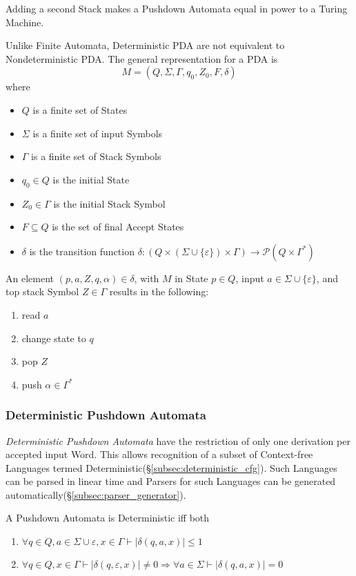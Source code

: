 \documentclass{article}
\begin{document}
Adding a second Stack makes a Pushdown Automata equal in power to a
Turing Machine.

Unlike Finite Automata, Deterministic PDA are not equivalent to
Nondeterministic PDA. The general representation for a PDA is
\[
    M = (Q, \Sigma, \Gamma, q_0, Z_0, F, \delta)
\]
where
\begin{itemize}
\item $Q$ is a finite set of States
\item $\Sigma$ is a finite set of input Symbols
\item $\Gamma$ is a finite set of Stack Symbols
\item $q_0 \in Q$ is the initial State
\item $Z_0 \in \Gamma$ is the initial Stack Symbol
\item $F \subseteq Q$ is the set of final Accept States
\item $\delta$ is the transition function $\delta: (Q \times (\Sigma
  \cup \{\varepsilon\}) \times \Gamma) \rightarrow \mathcal{P}(Q \times
  \Gamma^*)$
\end{itemize}

An element $(p,a,Z,q,\alpha)\in\delta$, with $M$ in State $p \in Q$,
input $a \in \Sigma \cup \{\varepsilon\}$, and top stack Symbol $Z \in
\Gamma$ results in the following:
\begin{enumerate}
\item read $a$
\item change state to $q$
\item pop $Z$
\item push $\alpha \in \Gamma^*$
\end{enumerate}

\subsubsection{Deterministic Pushdown Automata}\label{subsec:deterministic_pda}
\emph{Deterministic Pushdown Automata} have the restriction of only
one derivation per accepted input Word. This allows recognition of a
subset of Context-free Languages termed
Deterministic(\S\ref{subsec:deterministic_cfg}). Such Languages can be
parsed in linear time and Parsers for such Languages can be generated
automatically(\S\ref{subsec:parser_generator}).

A Pushdown Automata is Deterministic iff both
\begin{enumerate}
\item $\forall q \in Q, a \in \Sigma \cup {\varepsilon}, x \in
  \Gamma \vdash |\delta(q,a,x)| \leq 1$
\item $\forall q \in Q, x \in \Gamma \vdash |\delta(q,\varepsilon,x)|
  \neq 0 \Rightarrow \forall a \in \Sigma \vdash |\delta(q,a,x)|=0$
\end{enumerate}
\end{document}
